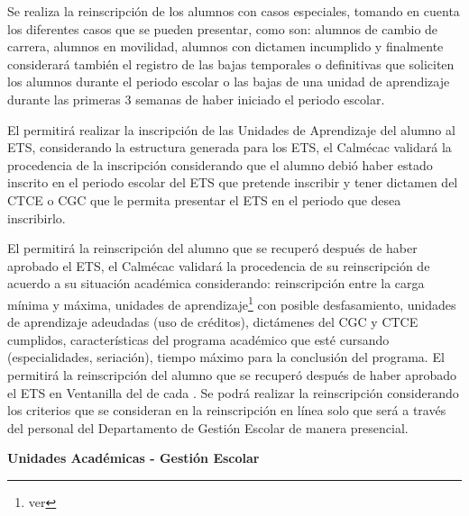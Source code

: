 \begin{PDescripcion}
\begin{enumerate}
		\Ppaso[\PSubProceso]  Se realiza la reinscripción de los alumnos con casos especiales, tomando en cuenta los diferentes casos que se pueden presentar, como son: alumnos de cambio de carrera, alumnos en movilidad, alumnos con dictamen incumplido y finalmente considerará también el registro de las bajas temporales o definitivas que soliciten los alumnos durante el periodo escolar o las bajas de una unidad de aprendizaje durante las primeras 3 semanas de haber iniciado el periodo escolar.  
		
		\Ppaso[\PSubProceso] 
		El  permitirá realizar la inscripción de las Unidades de Aprendizaje del alumno al ETS, considerando la estructura generada para los ETS, el Calmécac validará la procedencia de la inscripción considerando que el alumno debió haber estado inscrito en el periodo escolar del ETS que pretende inscribir y tener dictamen  del CTCE o CGC que le permita presentar el ETS en el periodo que desea inscribirlo.
		
		\Ppaso[\PSubProceso]  El  permitirá la reinscripción del alumno que se recuperó después de haber aprobado el ETS, el Calmécac validará la procedencia de su reinscripción de acuerdo a su situación académica considerando: reinscripción entre la carga mínima y máxima, unidades de aprendizaje\footnote{ver } con posible desfasamiento, unidades de aprendizaje adeudadas (uso de créditos), dictámenes del CGC y CTCE cumplidos, características del programa académico que esté cursando (especialidades, seriación), tiempo máximo para la conclusión del programa.		
		\Ppaso[\PSubProceso]  El  permitirá la reinscripción del alumno que se recuperó después de haber aprobado el ETS en Ventanilla del  de cada . Se podrá realizar la reinscripción considerando los criterios  que se consideran en la reinscripción en línea solo que será a través del personal del Departamento de Gestión Escolar de manera presencial.
		
		
		
	\end{enumerate}
	\Ppaso \textbf{Unidades Académicas - Gestión Escolar}
	\begin{enumerate}
		

\end{enumerate}
\end{PDescripcion}
